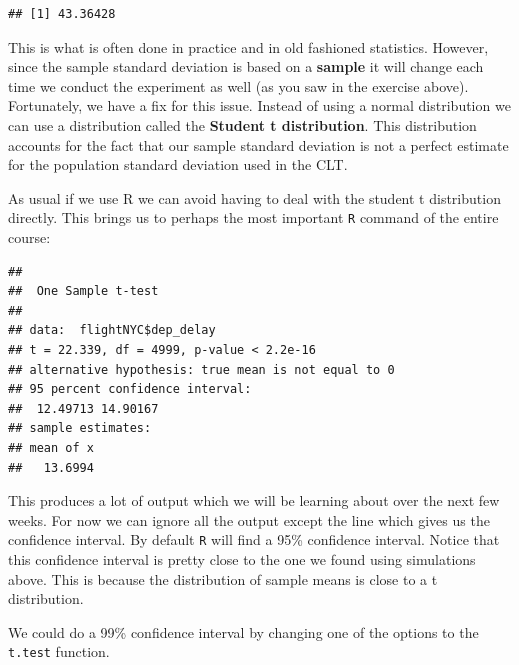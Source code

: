 \documentclass[
]{book}
\newenvironment{Shaded}{\begin{snugshade}}{\end{snugshade}}
\newcommand{\FunctionTok}[1]{\textcolor[rgb]{0.00,0.00,0.00}{#1}}
\newcommand{\NormalTok}[1]{#1}
\newcommand{\SpecialCharTok}[1]{\textcolor[rgb]{0.00,0.00,0.00}{#1}}
\theoremstyle{definition}
\theoremstyle{definition}
\theoremstyle{definition}
\theoremstyle{definition}
\theoremstyle{remark}
\begin{document}
\begin{Shaded}
\end{Shaded}

\begin{verbatim}
## [1] 43.36428
\end{verbatim}

This is what is often done in practice and in old fashioned statistics. However, since the sample standard deviation is based on a \textbf{sample} it will change each time we conduct the experiment as well (as you saw in the exercise above). Fortunately, we have a fix for this issue. Instead of using a normal distribution we can use a distribution called the \textbf{Student t distribution}. This distribution accounts for the fact that our sample standard deviation is not a perfect estimate for the population standard deviation used in the CLT.

As usual if we use R we can avoid having to deal with the student t distribution directly. This brings us to perhaps the most important \texttt{R} command of the entire course:

\begin{Shaded}
\end{Shaded}

\begin{verbatim}
## 
##  One Sample t-test
## 
## data:  flightNYC$dep_delay
## t = 22.339, df = 4999, p-value < 2.2e-16
## alternative hypothesis: true mean is not equal to 0
## 95 percent confidence interval:
##  12.49713 14.90167
## sample estimates:
## mean of x 
##   13.6994
\end{verbatim}

This produces a lot of output which we will be learning about over the next few weeks. For now we can ignore all the output except the line which gives us the confidence interval. By default \texttt{R} will find a 95\% confidence interval. Notice that this confidence interval is pretty close to the one we found using simulations above. This is because the distribution of sample means is close to a t distribution.

We could do a 99\% confidence interval by changing one of the options to the \texttt{t.test} function.
\end{document}
